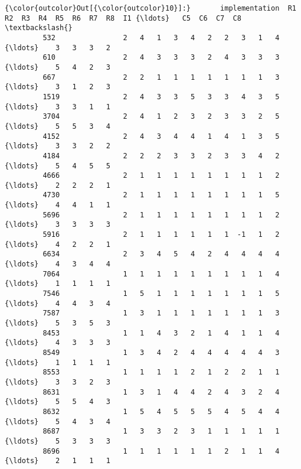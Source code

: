 \documentclass[11pt]{article}
\begin{document}
            \begin{Verbatim}[commandchars=\\\{\}]
{\color{outcolor}Out[{\color{outcolor}10}]:}       implementation  R1  R2  R3  R4  R5  R6  R7  R8  I1 {\ldots}   C5  C6  C7  C8  \textbackslash{}
         532                2   4   1   3   4   2   2   3   1   4 {\ldots}    3   3   3   2   
         610                2   4   3   3   3   2   4   3   3   3 {\ldots}    5   4   2   3   
         667                2   2   1   1   1   1   1   1   1   3 {\ldots}    3   1   2   3   
         1519               2   4   3   3   5   3   3   4   3   5 {\ldots}    3   3   1   1   
         3704               2   4   1   2   3   2   3   3   2   5 {\ldots}    5   5   3   4   
         4152               2   4   3   4   4   1   4   1   3   5 {\ldots}    3   3   2   2   
         4184               2   2   2   3   3   2   3   3   4   2 {\ldots}    5   4   5   5   
         4666               2   1   1   1   1   1   1   1   1   2 {\ldots}    2   2   2   1   
         4730               2   1   1   1   1   1   1   1   1   5 {\ldots}    4   4   1   1   
         5696               2   1   1   1   1   1   1   1   1   2 {\ldots}    3   3   3   3   
         5916               2   1   1   1   1   1   1  -1   1   2 {\ldots}    4   2   2   1   
         6634               2   3   4   5   4   2   4   4   4   4 {\ldots}    4   3   4   4   
         7064               1   1   1   1   1   1   1   1   1   4 {\ldots}    1   1   1   1   
         7546               1   5   1   1   1   1   1   1   1   5 {\ldots}    4   4   3   4   
         7587               1   3   1   1   1   1   1   1   1   3 {\ldots}    5   3   5   3   
         8453               1   1   4   3   2   1   4   1   1   4 {\ldots}    4   3   3   3   
         8549               1   3   4   2   4   4   4   4   4   3 {\ldots}    1   1   1   1   
         8553               1   1   1   1   2   1   2   2   1   1 {\ldots}    3   3   2   3   
         8631               1   3   1   4   4   2   4   3   2   4 {\ldots}    5   5   4   3   
         8632               1   5   4   5   5   5   4   5   4   4 {\ldots}    5   4   3   4   
         8687               1   3   3   2   3   1   1   1   1   1 {\ldots}    5   3   3   3   
         8696               1   1   1   1   1   1   2   1   1   4 {\ldots}    2   1   1   1   
         

\end{Verbatim}
\end{document}
